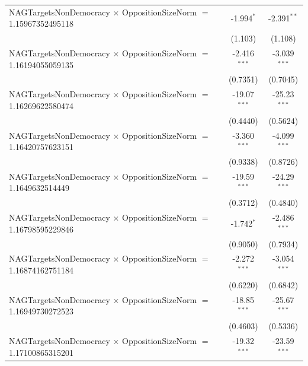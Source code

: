 \begin{tabular}{lcc}
   NAGTargetsNonDemocracy $\times$ OppositionSizeNorm $=$ 1.15967352495118      & -1.994$^{*}$         & -2.391$^{**}$\\   
                                                                                & (1.103)              & (1.108)\\   
   NAGTargetsNonDemocracy $\times$ OppositionSizeNorm $=$ 1.16194055059135      & -2.416$^{***}$       & -3.039$^{***}$\\   
                                                                                & (0.7351)             & (0.7045)\\   
   NAGTargetsNonDemocracy $\times$ OppositionSizeNorm $=$ 1.16269622580474      & -19.07$^{***}$       & -25.23$^{***}$\\   
                                                                                & (0.4440)             & (0.5624)\\   
   NAGTargetsNonDemocracy $\times$ OppositionSizeNorm $=$ 1.16420757623151      & -3.360$^{***}$       & -4.099$^{***}$\\   
                                                                                & (0.9338)             & (0.8726)\\   
   NAGTargetsNonDemocracy $\times$ OppositionSizeNorm $=$ 1.1649632514449       & -19.59$^{***}$       & -24.29$^{***}$\\   
                                                                                & (0.3712)             & (0.4840)\\   
   NAGTargetsNonDemocracy $\times$ OppositionSizeNorm $=$ 1.16798595229846      & -1.742$^{*}$         & -2.486$^{***}$\\   
                                                                                & (0.9050)             & (0.7934)\\   
   NAGTargetsNonDemocracy $\times$ OppositionSizeNorm $=$ 1.16874162751184      & -2.272$^{***}$       & -3.054$^{***}$\\   
                                                                                & (0.6220)             & (0.6842)\\   
   NAGTargetsNonDemocracy $\times$ OppositionSizeNorm $=$ 1.16949730272523      & -18.85$^{***}$       & -25.67$^{***}$\\   
                                                                                & (0.4603)             & (0.5336)\\   
   NAGTargetsNonDemocracy $\times$ OppositionSizeNorm $=$ 1.17100865315201      & -19.32$^{***}$       & -23.59$^{***}$\\   

\end{tabular}
